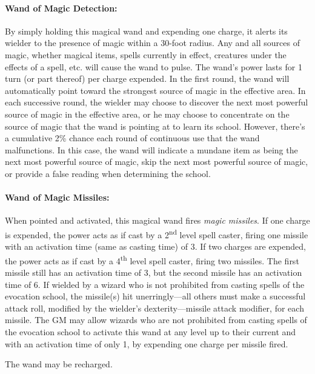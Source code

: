\begin{multicols}{2}
\paragraph{Wand of Magic Detection:} By simply holding this magical wand and expending one charge, it alerts its wielder to the presence of magic within a 30-foot radius.  Any and all sources of magic, whether magical items, spells currently in effect, creatures under the effects of a spell, etc. will cause the wand to pulse.  The wand's power lasts for 1 turn (or part thereof) per charge expended.  In the first round, the wand will automatically point toward the strongest source of magic in the effective area.  In each successive round, the wielder may choose to discover the next most powerful source of magic in the effective area, or he may choose to concentrate on the source of magic that the wand is pointing at to learn its school.  However, there's a cumulative 2\% chance each round of continuous use that the wand malfunctions.  In this case, the wand will indicate a mundane item as being the next most powerful source of magic, skip the next most powerful source of magic, or provide a false reading when determining the school.

\paragraph{Wand of Magic Missiles:} When pointed and activated, this magical wand fires \textit{magic missiles}.  If one charge is expended, the power acts as if cast by a 2\textsuperscript{nd} level spell caster, firing one missile with an activation time (same as casting time) of 3.  If two charges are expended, the power acts as if cast by a 4\textsuperscript{th} level spell caster, firing two missiles.  The first missile still has an activation time of 3, but the second missile has an activation time of 6.  If wielded by a wizard who is not prohibited from casting spells of the evocation school, the missile(s) hit unerringly---all others must make a successful attack roll, modified by the wielder's dexterity---missile attack modifier, for each missile.  The GM may allow wizards who are not prohibited from casting spells of the evocation school to activate this wand at any level up to their current and with an activation time of only 1, by expending one charge per missile fired. 

The wand may be recharged.


\end{multicols}
